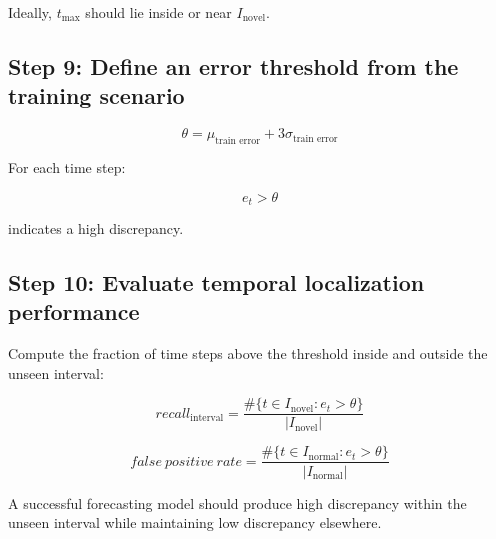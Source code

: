 \documentclass[a4paper]{article}
\begin{document}
            Ideally, \(t_{\max}\) should lie inside or near \(I_{\text{novel}}\).
        
        \subsection{Step 9: Define an error threshold from the training scenario}
            
            \[
                \theta =
                \mu_{\text{train error}}
                +
                3\sigma_{\text{train error}}
            \]
            
            For each time step:
            
            \[
                e_t > \theta
            \]
            
            indicates a high discrepancy.
        
        \subsection{Step 10: Evaluate temporal localization performance}
            
            Compute the fraction of time steps above the threshold inside and outside the unseen interval:
            
            \[
                recall_{\text{interval}} =
                \frac{
                    \#\{t \in I_{\text{novel}} : e_t > \theta\}
                }{
                    |I_{\text{novel}}|
                }
            \]
            
            \[
                false\ positive\ rate =
                \frac{
                    \#\{t \in I_{\text{normal}} : e_t > \theta\}
                }{
                    |I_{\text{normal}}|
                }
            \]
            
            A successful forecasting model should produce high discrepancy within the unseen interval while maintaining low discrepancy elsewhere.
\end{document}
